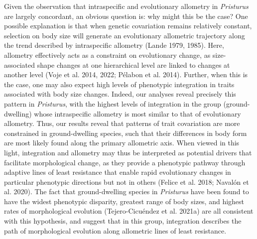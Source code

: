 \documentclass[
  11pt,
]{article}
\begin{document}
Given the observation that intraspecific and evolutionary allometry in
\emph{Pristurus} are largely concordant, an obvious question is: why
might this be the case? One possible explanation is that when genetic
covariation remains relatively constant, selection on body size will
generate an evolutionary allometric trajectory along the trend described
by intraspecific allometry (Lande 1979, 1985). Here, allometry
effectively acts as a constraint on evolutionary change, as
size-associated shape changes at one hierarchical level are linked to
changes at another level (Voje et al. 2014, 2022; Pélabon et al. 2014).
Further, when this is the case, one may also expect high levels of
phenotypic integration in traits associated with body size changes.
Indeed, our analyses reveal precisely this pattern in \emph{Pristurus},
with the highest levels of integration in the group (ground-dwelling)
whose intraspecific allometry is most similar to that of evolutionary
allometry. Thus, our results reveal that patterns of trait covariation
are more constrained in ground-dwelling species, such that their
differences in body form are most likely found along the primary
allometric axis. When viewed in this light, integration and allometry
may thus be interpreted as potential drivers that facilitate
morphological change, as they provide a phenotypic pathway through
adaptive lines of least resistance that enable rapid evolutionary
changes in particular phenotypic directions but not in others (Felice et
al. 2018; Navalón et al. 2020). The fact that ground-dwelling species in
\emph{Pristurus} have been found to have the widest phenotypic
disparity, greatest range of body sizes, and highest rates of
morphological evolution (Tejero-Cicuéndez et al. 2021a) are all
consistent with this hypothesis, and suggest that in this group,
integration describes the path of morphological evolution along
allometric lines of least resistance. \hfill\break
\end{document}
